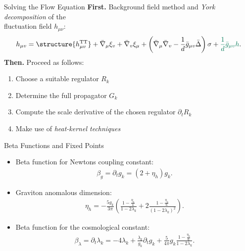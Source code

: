 \documentclass{beamer}
\begin{document}
\begin{frame}{Solving the Flow Equation}
\textbf{First.} Background field method and \textit{York decomposition} of the \\ \hspace{0.9cm} fluctuation field $h_{\mu\nu}$:
\begin{equation}
	h_{\mu v}= \structure{h_{\mu v}^{\mathrm{TT}}}+\bar{\nabla}_{\mu} \xi_{v}+\bar{\nabla}_{v} \xi_{\mu}+\left(\bar{\nabla}_{\mu} \bar{\nabla}_{v}-\frac{1}{d} \bar{g}_{\mu v} \bar{\Delta}\right) \sigma+\textcolor{BScGreen}{\frac{1}{d} \bar{g}_{\mu v} h}.
	\label{eqn:York}
\end{equation}
\textbf{Then.} Proceed as follows:\vspace{0.3cm}
\begin{enumerate}
	\item Choose a suitable regulator $R_k$\vspace{0.4cm}
	\item Determine the full propagator $G_k$\vspace{0.4cm}
	\item Compute the scale derivative of the chosen regulator $\partial_tR_k$\vspace{0.4cm}
	\item Make use of \textit{heat-kernel techniques}
\end{enumerate}
	
\end{frame}

\begin{frame}{Beta Functions and Fixed Points}
\begin{itemize}
	\item Beta function for Newtons coupling constant:
	\begin{align}
	\beta_g = \partial_t g_k = \left(2 + \eta_h\right)g_k.
	\label{eqn:beta_gk}
\end{align}
	\item Graviton anomalous dimension:
	\begin{align}
\eta_h = -\frac{5g_k}{3\pi} \left(\frac{1-\frac{\eta_h}{4}}{1-2\lambda_k} + 2\frac{1-\frac{\eta_h}{6}}{(1-2\lambda_k)^2}\right).	
\end{align}
	\item Beta function for the cosmological constant:
	\begin{align}
	\beta_{\lambda} = \partial_t\lambda_k = -4\lambda_k + \frac{\lambda_k}{g_k} \partial_t g_k + \frac{5}{4\pi}g_k\frac{1-\frac{\eta_h}{6}}{1-2\lambda_k}.
\end{align}
\end{itemize}
\end{frame}
\end{document}
